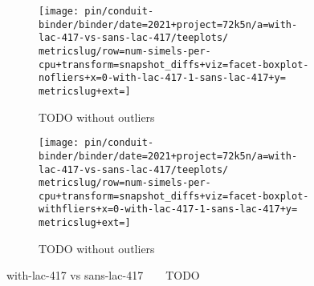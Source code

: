 \begin{figure*}
  \centering
  \begin{subfigure}[b]{0.5\textwidth}
    \centering
    \texttt{[image: pin/conduit-binder/binder/date=2021+project=72k5n/a=with-lac-417-vs-sans-lac-417/teeplots/\\metricslug/row=num-simels-per-cpu+transform=snapshot\_diffs+viz=facet-boxplot-nofliers+x=0-with-lac-417-1-sans-lac-417+y=\\metricslug+ext=]}
    \caption{TODO without outliers}
    \label{fig:with-lac-417-vs-sans-lac-417-distribution-\metricslug-nofliers}
  \end{subfigure}%
  \begin{subfigure}[b]{0.5\textwidth}
    \centering
    \texttt{[image: pin/conduit-binder/binder/date=2021+project=72k5n/a=with-lac-417-vs-sans-lac-417/teeplots/\\metricslug/row=num-simels-per-cpu+transform=snapshot\_diffs+viz=facet-boxplot-withfliers+x=0-with-lac-417-1-sans-lac-417+y=\\metricslug+ext=]}
    \caption{TODO without outliers}
    \label{fig:with-lac-417-vs-sans-lac-417-distribution-\metricslug-withfliers}
  \end{subfigure}
  \caption{with-lac-417 vs sans-lac-417 ~ \metric ~ TODO}
  \label{fig:with-lac-417-vs-sans-lac-417-distribution-\metricslug}
\end{figure*}
